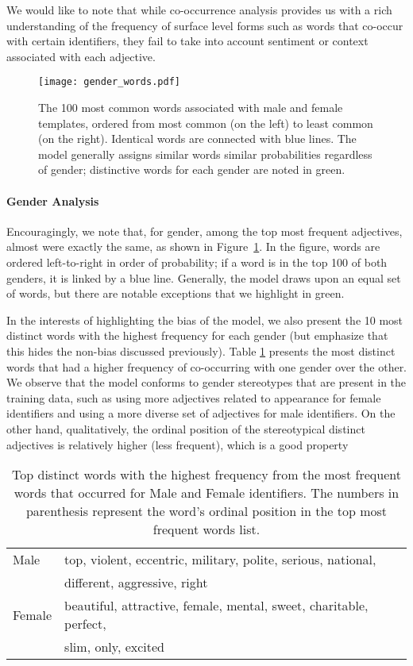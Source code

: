 \documentclass[11pt]{article}
\begin{document}
We would like to note that while co-occurrence analysis provides us with a rich understanding of the frequency of surface level forms such as words that co-occur with certain identifiers, they fail to take into account sentiment or context associated with each adjective.




\begin{figure}
    \centering
    \texttt{[image: gender\_words.pdf]}
    \caption{The 100 most common words associated with male and female templates, ordered from most common (on the left) to least common (on the right). Identical words are connected with blue lines. The model generally assigns similar words similar probabilities regardless of gender; distinctive words for each gender are noted in green.}
    \label{fig:words}
\end{figure}

\paragraph{Gender Analysis} Encouragingly, we note that, for gender, among the top  most frequent adjectives, almost  were exactly the same, as shown in Figure~\ref{fig:words}.  In the figure, words are ordered left-to-right in order of probability; if a word is in the top 100 of both genders, it is linked by a blue line.  Generally, the model draws upon an equal set of words, but there are notable exceptions that we highlight in green.

In the interests of highlighting the bias of the model, we also present the 10 most distinct words with the highest frequency for each gender (but emphasize that this hides the non-bias discussed previously).
Table \ref{tab:gender_adj} presents the most distinct words that had a higher frequency of co-occurring with one gender over the other.
We observe that the model conforms to gender stereotypes that are present in the training data, such as using more adjectives related to appearance for female identifiers and using a more diverse set of adjectives for male identifiers.  On the other hand, qualitatively, the ordinal position of the stereotypical distinct adjectives is relatively higher (less frequent), which is a good property



\begin{table}[!t]
    \centering
    \begin{tabular}{l l}
    \toprule
        Male & top, violent, eccentric, military, polite, serious, national, \\
        & different, aggressive, right \\
        Female & beautiful, attractive, female, mental, sweet, charitable, perfect, \\
        & slim, only, excited\\
    \bottomrule
    \end{tabular}
    \caption{Top  distinct words with the highest frequency from the  most frequent words that occurred for Male and Female identifiers. The numbers in parenthesis represent the word's ordinal position in the top  most frequent words list.}
    \label{tab:gender_adj}
\end{table}
\end{document}
